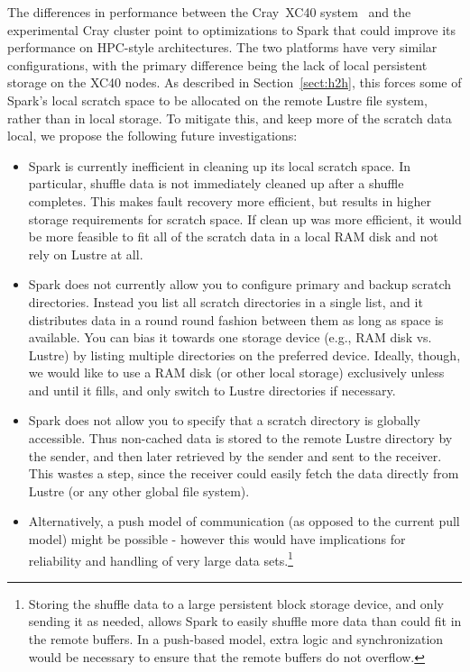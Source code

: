 The differences in performance between the Cray{\textsuperscript{\tiny\textregistered}}~XC40{\textsuperscript{\tiny\texttrademark}} system~\cite{alverson2012cray,craycascadesc12} and the experimental Cray cluster point to optimizations to Spark that could improve its performance on HPC-style architectures.  The two platforms have very similar configurations, with the primary difference being the lack of local persistent storage on the XC40 nodes.  As described in Section~\ref{sect:h2h}, this forces some of Spark's local scratch space to be allocated on the remote Lustre file system, rather than in local storage.  To mitigate this, and keep more of the scratch data local, we propose the following future investigations:
\begin{itemize}
\item Spark is currently inefficient in cleaning up its local scratch space.  In particular, shuffle data is not immediately cleaned up after a shuffle completes.  This makes fault recovery more efficient, but results in higher storage requirements for scratch space.  If clean up was more efficient, it would be more feasible to fit all of the scratch data in a local RAM disk and not rely on Lustre at all.
\item Spark does not currently allow you to configure primary and backup scratch directories.  Instead you list all scratch directories in a single list, and it distributes data in a round round fashion between them as long as space is available.  You can bias it towards one storage device (e.g., RAM disk vs. Lustre) by listing multiple directories on the preferred device.  Ideally, though, we would like to use a RAM disk (or other local storage) exclusively unless and until it fills, and only switch to Lustre directories if necessary.
\item Spark does not allow you to specify that a scratch directory is globally accessible.  Thus non-cached data is stored to the remote Lustre directory by the sender, and then later retrieved by the sender and sent to the receiver.  This wastes a step, since the receiver could easily fetch the data directly from Lustre (or any other global file system).
\item Alternatively, a push model of communication (as opposed to the current pull model) might be possible - however this would have implications for reliability and handling of very large data sets.\footnote{Storing the shuffle data to a large persistent block storage device, and only sending it as needed, allows Spark to easily shuffle more data than could fit in the remote buffers.  In a push-based model, extra logic and synchronization would be necessary to ensure that the remote buffers do not overflow.}
\end{itemize}
